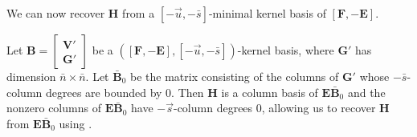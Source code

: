 We can now recover $\mathbf{H}$ from a $\left[-\vec{u},-\bar{s}\right]$-minimal
kernel basis of $\left[\mathbf{F},-\mathbf{E}\right]$.
\begin{lem}
\label{lem:expandH}Let $\mathbf{B}=\begin{bmatrix}\mathbf{V}'\\
\mathbf{G}'
\end{bmatrix}$ be a $\left(\left[\mathbf{F},-\mathbf{E}\right],\left[-\vec{u},-\bar{s}\right]\right)$-kernel
basis, where $\mathbf{G}'$ has dimension $\bar{n}\times\bar{n}$.
Let $\bar{\mathbf{B}}_{0}$ be the matrix consisting of the columns
of $\mathbf{G}'$ whose $-\bar{s}$-column degrees are bounded by
0. Then $\mathbf{H}$ is a column basis of $\mathbf{E}\bar{\mathbf{B}}_{0}$
and the nonzero columns of $\mathbf{E}\bar{\mathbf{B}}_{0}$ have
$-\vec{s}$-column degrees 0, allowing us to recover $\mathbf{H}$
from $\mathbf{E}\bar{\mathbf{B}}_{0}$ using .\end{lem}
